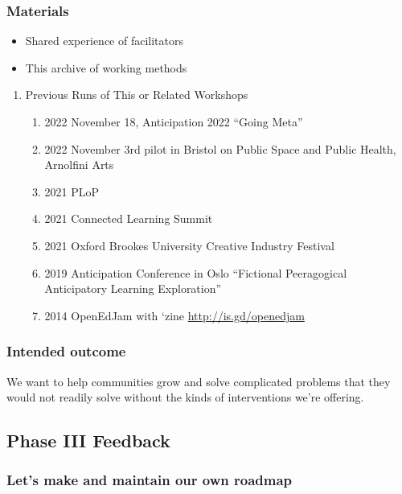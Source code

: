 \documentclass[11pt]{article}
\begin{document}
\subsubsection{Materials}
\label{sec:org550cc26}

\begin{itemize}
\item Shared experience of facilitators
\item This archive of working methods
\end{itemize}

\begin{enumerate}
\item Previous Runs of This or Related Workshops
\label{sec:org18dfa67}
\begin{enumerate}
\item 2022 November 18, Anticipation 2022 ``Going Meta''
\label{sec:org1bc1a2a}
\item 2022 November 3rd pilot in Bristol on Public Space and Public Health, Arnolfini Arts
\label{sec:org79eccc8}
\item 2021 PLoP
\label{sec:org218ec5b}
\item 2021 Connected Learning Summit
\label{sec:orgdec1f98}
\item 2021 Oxford Brookes University Creative Industry Festival
\label{sec:orgeb83126}
\item 2019 Anticipation Conference in Oslo “Fictional Peeragogical Anticipatory Learning Exploration”
\label{sec:orgc8de25e}
\item 2014 OpenEdJam with ‘zine \url{http://is.gd/openedjam}
\label{sec:org2785ca5}
\end{enumerate}
\end{enumerate}


\subsubsection{Intended outcome}
\label{sec:org0f11016}
We want to help communities grow and solve complicated problems that they would not readily solve without the kinds of interventions we’re offering.

\subsection{Phase III Feedback}
\label{sec:orgda953eb}

\subsubsection{Let’s make and maintain our own roadmap}
\label{sec:org7862d11}
\end{document}
